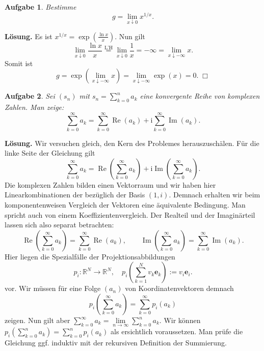 \documentclass[a4paper,10pt,fleqn,twoside]{scrartcl}
\numberwithin{equation}{section}
\newcommand{\R}{\mathbb R}
\newcommand{\ui}{\mathrm i}
\newcommand{\real}{\operatorname{Re}}
\newcommand{\imag}{\operatorname{Im}}
\newcommand{\strong}[1]{{\normalfont\sffamily\bfseries #1}}
\theoremstyle{Aufgabe}
\newtheorem{Aufgabe}{\sffamily Aufgabe}[section]
\begin{document}
\begin{Aufgabe}
Bestimme
\[g=\lim_{x\downarrow 0} x^{1/x}.\]
\end{Aufgabe}
\noindent
\strong{Lösung.} Es ist $x^{1/x}=\exp(\frac{\ln x}{x})$.
Nun gilt
\begin{equation}
\lim_{x\downarrow 0}\frac{\ln x}{x}
\stackrel{\text{L'H}}= \lim_{x\downarrow 0}\frac{1}{x}
= -\infty = \lim_{x\downarrow -\infty} x.
\end{equation}
Somit ist
\begin{equation}
g = \exp(\lim_{x\downarrow -\infty} x)
= \lim_{x\downarrow -\infty} \exp(x) = 0.\;\Box
\end{equation}

\begin{Aufgabe}
Sei $(s_n)$ mit $s_n=\sum_{k=0}^n a_k$ eine konvergente Reihe von
komplexen Zahlen. Man zeige:
\[\sum_{k=0}^\infty a_k
= \sum_{k=0}^\infty \real(a_k)+\ui\sum_{k=0}^\infty \imag(a_k).\]
\end{Aufgabe}
\strong{Lösung.} Wir versuchen gleich, den Kern des Problemes
herauszuschälen. Für die linke Seite der Gleichung gilt
\begin{equation}
\sum_{k=0}^\infty a_k
= \real(\sum_{k=0}^\infty a_k)+\ui\imag(\sum_{k=0}^\infty a_k).
\end{equation}
Die komplexen Zahlen bilden einen Vektorraum und wir haben hier
Linearkombinationen der bezüglich der Basis $(1,i)$. Demnach erhalten
wir beim komponentenweisen Vergleich der Vektoren eine äquivalente
Bedingung. Man spricht auch von einem Koeffizientenvergleich.
Der Realteil und der Imaginärteil lassen sich also separat betrachten:
\begin{equation}
\real(\sum_{k=0}^\infty a_k) = \sum_{k=0}^\infty \real(a_k),
\qquad \imag(\sum_{k=0}^\infty a_k) = \sum_{k=0}^\infty \imag(a_k).
\end{equation}
Hier liegen die Spezialfälle der Projektionsabbildungen
\begin{equation}
p_i\colon\R^N\to\R^N,\quad p_i(\sum_{k=1}^N v_k\mathbf e_k) := v_i\mathbf e_i.
\end{equation}
vor. Wir müssen für eine Folge $(a_n)$ von Koordinatenvektoren
demnach
\begin{equation}
p_i(\sum_{k=0}^\infty a_k) = \sum_{k=0}^\infty p_i(a_k)
\end{equation}
zeigen. Nun gilt aber
$\sum_{k=0}^\infty a_k = \lim\limits_{n\to\infty}\sum_{k=0}^n a_k$.
Wir können $p_i(\sum_{k=0}^n a_k) = \sum_{k=0}^n p_i(a_k)$ als
ersichtlich voraussetzen. Man prüfe die Gleichung ggf. induktiv mit
der rekursiven Definition der Summierung.
\end{document}
